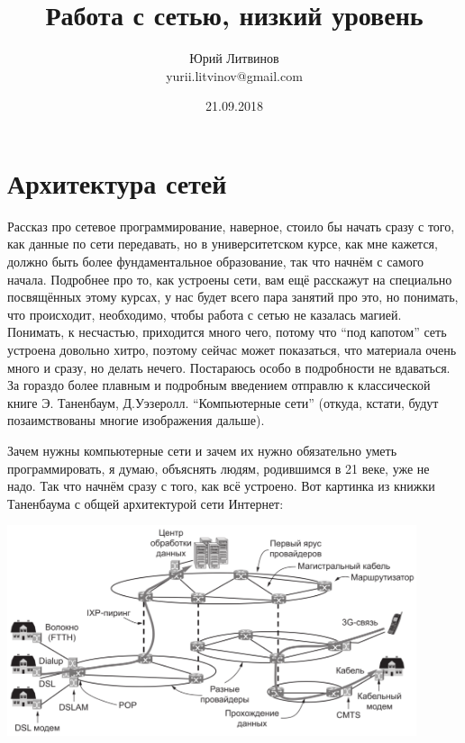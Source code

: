 \documentclass[a5paper]{article}
\title{Работа с сетью, низкий уровень}
\author{Юрий Литвинов\\\small{yurii.litvinov@gmail.com}}
\date{21.09.2018}
\begin{document}
\maketitle
\thispagestyle{empty}

\section{Архитектура сетей}

Рассказ про сетевое программирование, наверное, стоило бы начать сразу с того, как данные по сети передавать, но в университетском курсе, как мне кажется, должно быть более фундаментальное образование, так что начнём с самого начала. Подробнее про то, как устроены сети, вам ещё расскажут на специально посвящённых этому курсах, у нас будет всего пара занятий про это, но понимать, что происходит, необходимо, чтобы работа с сетью не казалась магией. Понимать, к несчастью, приходится много чего, потому что ``под капотом'' сеть устроена довольно хитро, поэтому сейчас может показаться, что материала очень много и сразу, но делать нечего. Постараюсь особо в подробности не вдаваться. За гораздо более плавным и подробным введением отправлю к классической книге Э. Таненбаум, Д.Уэзеролл. ``Компьютерные сети'' (откуда, кстати, будут позаимствованы многие изображения дальше).

Зачем нужны компьютерные сети и зачем их нужно обязательно уметь программировать, я думаю, объяснять людям, родившимся в 21 веке, уже не надо. Так что начнём сразу с того, как всё устроено. Вот картинка из книжки Таненбаума с общей архитектурой сети Интернет:
\begin{center}
	\includegraphics[width=0.9\textwidth]{internetArchitecture.png}
\end{center}
\end{document}
